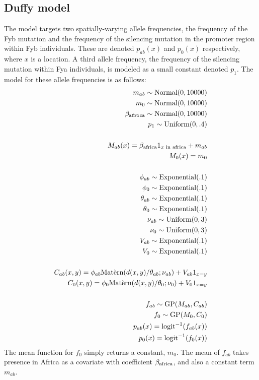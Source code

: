  
\subsection*{Duffy model}
The model targets two spatially-varying allele frequencies, the frequency of the Fyb mutation and the frequency of the silencing mutation in the promoter region within Fyb individuals. These are denoted $p_{ab}(x)$ and $p_0(x)$ respectively, where $x$ is a location. A third allele frequency, the frequency of the silencing mutation within Fya individuals, is modeled as a small constant denoted $p_1$. The model for these allele frequencies is as follows:
\begin{eqnarray*}
    m_{ab} \sim \textup{Normal}(0,10000) \\
    m_0 \sim \textup{Normal}(0,10000)\\
    \beta_{\mathtt{africa}} \sim \textup{Normal}(0,10000)\\
    p_1\sim\textup{Uniform}(0,.4)\\
    \\
    M_{ab}(x) = \beta_{\textup{africa}} 1_{x\textup{\ in\ africa}} + m_{ab}\\
    M_0(x) = m_0\\
    \\
    \phi_{ab}\sim\textup{Exponential}(.1)\\
    \phi_{0}\sim\textup{Exponential}(.1)\\
    \theta_{ab}\sim\textup{Exponential}(.1)\\
    \theta_{0}\sim\textup{Exponential}(.1)\\
    \nu_{ab}\sim\textup{Uniform}(0,3)\\
    \nu_{0}\sim\textup{Uniform}(0,3)\\
    V_{ab}\sim\textup{Exponential}(.1)\\
    V_0\sim\textup{Exponential}(.1)\\
    \\
    C_{ab}(x,y) = \phi_{ab}\textup{Mat\`ern}(d(x,y)/\theta_{ab};\nu_{ab})+V_{ab}1_{x=y}\\
    C_{0}(x,y) = \phi_{0}\textup{Mat\`ern}(d(x,y)/\theta_{0};\nu_{0})+V_{0}1_{x=y}\\
    \\
    f_{ab}\sim\textup{GP}(M_{ab},C_{ab})\\
    f_{0}\sim\textup{GP}(M_{0},C_{0})\\
    p_{ab}(x)=\textup{logit}^{-1}(f_{ab}(x)) \\
    p_{0}(x)=\textup{logit}^{-1}(f_{0}(x))     
\end{eqnarray*}
The mean function for $f_0$ simply returns a constant, $m_0$. The mean of $f_{ab}$ takes presence in Africa as a covariate with coefficient $\beta_{\textup{africa}}$, and also a constant term $m_{ab}$. 

